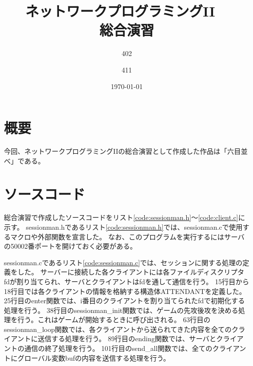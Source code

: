 \documentclass[a4j, titlepage, 10pt]{jsarticle}
\begin{document}
\title{{ \Huge ネットワークプログラミングII }~\\{ \LARGE 総合演習 }}
\author{{ \Large 402 } \and { \Large 411 }}
\date{\today}
\maketitle

\section{概要}

今回、ネットワークプログラミングIIの総合演習として作成した作品は「六目並べ」である。

\section{ソースコード}

総合演習で作成したソースコードをリスト\ref{code:sessionman.h}～\ref{code:client.c}に示す。
sessionman.hであるリスト\ref{code:sessionman.h}では、sessionman.cで使用するマクロや外部関数を宣言した。
なお、このプログラムを実行するにはサーバの50002番ポートを開けておく必要がある。

\lstset{ numbers = left }


sessionman.cであるリスト\ref{code:sessionman.c}では、セッションに関する処理の定義をした。
サーバーに接続した各クライアントには各ファイルディスクリプタfdが割り当てられ、サーバとクライアントはfdを通して通信を行う。
15行目から18行目では各クライアントの情報を格納する構造体ATTENDANTを定義した。
25行目のenter関数では、i番目のクライアントを割り当てられたfdで初期化する処理を行う。
38行目のsessionman\_init関数では、ゲームの先攻後攻を決める処理を行う。これはゲームが開始するときに呼び出される。
63行目のsessionman\_loop関数では、各クライアントから送られてきた内容を全てのクライアントに送信する処理を行う。
89行目のending関数では、サーバとクライアントの通信の終了処理を行う。
101行目のsend\_all関数では、全てのクライアントにグローバル変数bufの内容を送信する処理を行う。

\lstset{ numbers = left }

\end{document}
